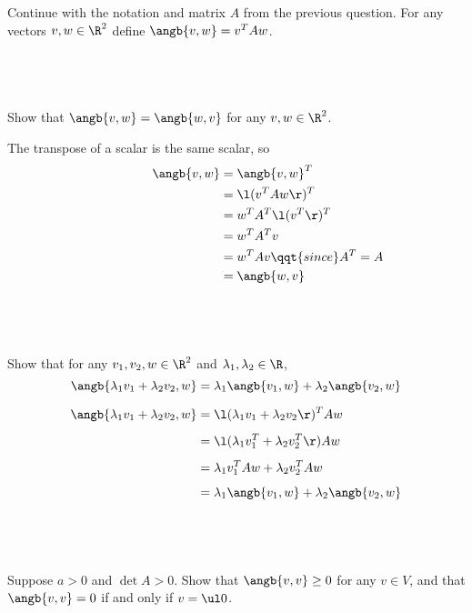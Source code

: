 \documentclass[a4paper]{article}
\begin{document}
\begin{questionbody}
Continue with the notation and matrix $A$ from the previous question. For any vectors $v, w \in \R^2$ define $\angb{v,w} = v^T A w$.
\end{questionbody}

\subsection{~} %

\begin{questionbody}
Show that $\angb{v, w} = \angb{w, v}$ for any $v, w \in \R^2$.
\end{questionbody}

The transpose of a scalar is the same scalar, so \begin{align*}
\quad\qquad\qquad \angb{v, w} &= \angb{v, w}^T\\
&= \l( v^T A w \r)^T\\
&= w^T A^T \l( v^T \r)^T\\
&= w^T A^T v\\
&= w^T A v \qqt{since }A^T = A\\
&= \angb{w, v}
\end{align*}

\subsection{~} %

\begin{questionbody}
Show that for any $v_1, v_2, w \in \R^2$ and $\lambda_1, \lambda_2 \in \R$,
$$\angb{\lambda_1 v_1 + \lambda_2 v_2, w} = \lambda_1 \angb{v_1, w} + \lambda_2 \angb{v_2, w}$$
\end{questionbody}

\begin{align*}
\angb{\lambda_1 v_1 + \lambda_2 v_2, w} &= \l(\lambda_1 v_1 + \lambda_2 v_2\r)^T A w\\[1ex]
&= \l(\lambda_1 v_1^T + \lambda_2 v_2^T\r) A w\\[1ex]
&= \lambda_1 v_1^T A w + \lambda_2 v_2^T A w\\[1ex]
&= \lambda_1 \angb{v_1, w} + \lambda_2 \angb{v_2, w}
\end{align*}

\subsection{~} %

\begin{questionbody}
Suppose $a > 0$ and $\det A > 0$. Show that $\angb{v, v} \ge 0$ for any $v \in V$, and that $\angb{v, v} = 0$ if and only if $v = \ul 0$.
\end{questionbody}
\end{document}
